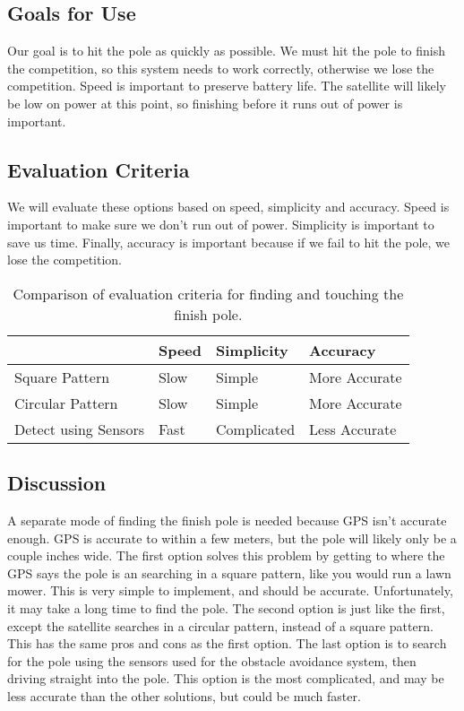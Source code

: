 \documentclass[10pt,letterpaper,onecolumn,journal]{IEEEtran}
\begin{document}
\subsection{Goals for Use}
Our goal is to hit the pole as quickly as possible. We must hit the pole to finish the competition, so this system needs to work correctly, otherwise we lose the competition. Speed is important to preserve battery life. The satellite will likely be low on power at this point, so finishing before it runs out of power is important.

\subsection{Evaluation Criteria}
We will evaluate these options based on speed, simplicity and accuracy. Speed is important to make sure we don’t run out of power. Simplicity is important to save us time. Finally, accuracy is important because if we fail to hit the pole, we lose the competition.

\begin{table}[h!]
  \centering
  \caption{Comparison of evaluation criteria for finding and touching the finish pole.}
  \label{tab:table1}
  \begin{tabular}{l||l|l|l}
                          & Speed & Simplicity   & Accuracy \\
    \hline
    Square Pattern        & Slow  & Simple       & More Accurate  \\
    \hline
    Circular Pattern      & Slow  & Simple       & More Accurate \\
    \hline
    Detect using Sensors  & Fast  & Complicated  & Less Accurate  \\
  \end{tabular}
\end{table}

\subsection{Discussion}
A separate mode of finding the finish pole is needed because GPS isn’t accurate enough. GPS is accurate to within a few meters, but the pole will likely only be a couple inches wide. The first option solves this problem by getting to where the GPS says the pole is an searching in a square pattern, like you would run a lawn mower. This is very simple to implement, and should be accurate. Unfortunately, it may take a long time to find the pole. The second option is just like the first, except the satellite searches in a circular pattern, instead of a square pattern. This has the same pros and cons as the first option. The last option is to search for the pole using the sensors used for the obstacle avoidance system, then driving straight into the pole. This option is the most complicated, and may be less accurate than the other solutions, but could be much faster.
\end{document}
